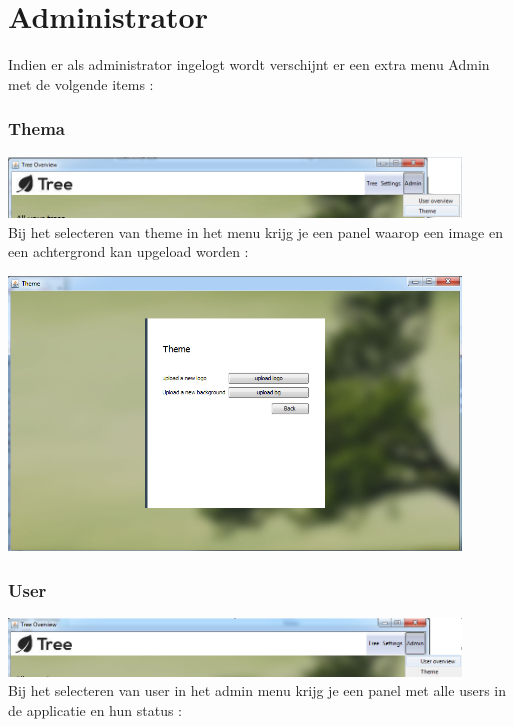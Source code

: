 \documentclass[pdftex,a4paper,12pt,twoside]{report}
\begin{document}
\chapter{Administrator}
Indien er als administrator ingelogt wordt verschijnt er een extra menu Admin met de volgende items :
\subsection{Thema}
\includegraphics[width=12cm]{images/admin_themeoverview_menu.png}\\[.5cm]

Bij het selecteren van theme in het menu krijg je een panel waarop een image en een achtergrond kan upgeload worden :

\includegraphics[width=12cm]{images/theme.png}\\[.5cm]

\subsection{User}

\includegraphics[width=12cm]{images/admin_useroverview_menu.png}\\[.5cm]

Bij het selecteren van user in het admin menu krijg je een panel met alle users in de applicatie en hun status : 
\end{document}
